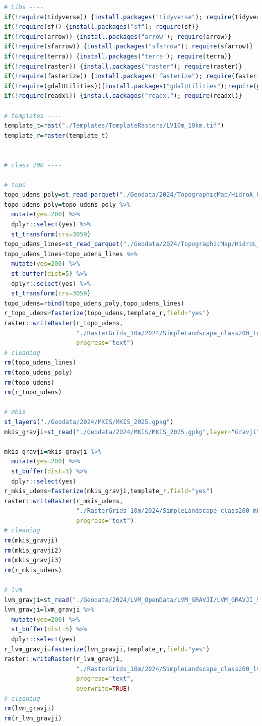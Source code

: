 \documentclass[
]{book}
\begin{document}
\begin{lstlisting}[language=R]
# Libs ----
if(!require(tidyverse)) {install.packages("tidyverse"); require(tidyverse)}
if(!require(sf)) {install.packages("sf"); require(sf)}
if(!require(arrow)) {install.packages("arrow"); require(arrow)}
if(!require(sfarrow)) {install.packages("sfarrow"); require(sfarrow)}
if(!require(terra)) {install.packages("terra"); require(terra)}
if(!require(raster)) {install.packages("raster"); require(raster)}
if(!require(fasterize)) {install.packages("fasterize"); require(fasterize)}
if(!require(gdalUtilities)){install.packages("gdalUtilities");require(gdalUtilities)}
if(!require(readxl)) {install.packages("readxl"); require(readxl)}

# templates ----
template_t=rast("./Templates/TemplateRasters/LV10m_10km.tif")
template_r=raster(template_t)


# class 200 ----

# topo
topo_udens_poly=st_read_parquet("./Geodata/2024/TopographicMap/HidroA_COMB.parquet")
topo_udens_poly=topo_udens_poly %>% 
  mutate(yes=200) %>% 
  dplyr::select(yes) %>% 
  st_transform(crs=3059)
topo_udens_lines=st_read_parquet("./Geodata/2024/TopographicMap/HidroL_COMB.parquet")
topo_udens_lines=topo_udens_lines %>% 
  mutate(yes=200) %>% 
  st_buffer(dist=5) %>% 
  dplyr::select(yes) %>% 
  st_transform(crs=3059)
topo_udens=rbind(topo_udens_poly,topo_udens_lines)
r_topo_udens=fasterize(topo_udens,template_r,field="yes")
raster::writeRaster(r_topo_udens,
                    "./RasterGrids_10m/2024/SimpleLandscape_class200_topo.tif",
                    progress="text")
# cleaning
rm(topo_udens_lines)
rm(topo_udens_poly)
rm(topo_udens)
rm(r_topo_udens)

# mkis
st_layers("./Geodata/2024/MKIS/MKIS_2025.gpkg")
mkis_gravji=st_read("./Geodata/2024/MKIS/MKIS_2025.gpkg",layer="Gravji")

mkis_gravji=mkis_gravji %>% 
  mutate(yes=200) %>% 
  st_buffer(dist=3) %>% 
  dplyr::select(yes)
r_mkis_udens=fasterize(mkis_gravji,template_r,field="yes")
raster::writeRaster(r_mkis_udens,
                    "./RasterGrids_10m/2024/SimpleLandscape_class200_mkis.tif",
                    progress="text")
# cleaning
rm(mkis_gravji)
rm(mkis_gravji2)
rm(mkis_gravji3)
rm(r_mkis_udens)

# lvm
lvm_gravji=st_read("./Geodata/2024/LVM_OpenData/LVM_GRAVJI/LVM_GRAVJI_Shape.shp")
lvm_gravji=lvm_gravji %>% 
  mutate(yes=200) %>% 
  st_buffer(dist=5) %>% 
  dplyr::select(yes)
r_lvm_gravji=fasterize(lvm_gravji,template_r,field="yes")
raster::writeRaster(r_lvm_gravji,
                    "./RasterGrids_10m/2024/SimpleLandscape_class200_lvm.tif",
                    progress="text",
                    overwrite=TRUE)
# cleaning
rm(lvm_gravji)
rm(r_lvm_gravji)



\end{lstlisting}
\end{document}
